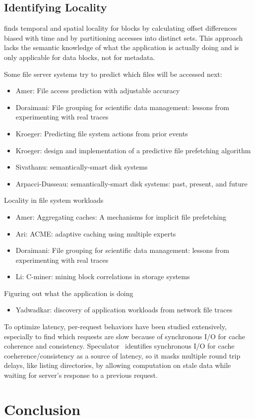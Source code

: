 \documentclass[conference]{acm_proc_article-sp} \usepackage[english]{babel}
\begin{document}
\subsection{Identifying Locality} \cite{wildani:systor2011-block-locality}
finds temporal and spatial locality for blocks by calculating offset
differences biased with time and by partitioning accesses into distinct sets.
This approach lacks the semantic knowledge of what the application is actually
doing and is only applicable for data blocks, not for metadata.

Some file server systems try to predict which files will be accessed next:

\begin{itemize} \item Amer: File access prediction with adjustable accuracy
\item Doraimani: File grouping for scientific data management: lessons from
experimenting with real traces \item Kroeger: Predicting file system actions
from prior events \item Kroeger: design and implementation of a predictive file
prefetching algorithm \item Sivathanu: semantically-smart disk systems \item
Arpacci-Dusseau: semantically-smart disk systems: past, present, and future
\end{itemize}

Locality in file system workloads \begin{itemize} \item Amer: Aggregating
caches: A mechanisms for implicit file prefetching \item Ari: ACME: adaptive
caching using multiple experts \item Doraimani: File grouping for scientific
data management: lessons from experimenting with real traces \item Li: C-miner:
mining block correlations in storage systems \end{itemize}

Figuring out what the application is doing \begin{itemize} \item Yadwadkar:
discovery of application workloads from network file traces \end{itemize}

To optimize latency, per-request behaviors have been studied extensively,
especially to find which requests are slow because of synchronous I/O for cache
coherence and consistency. Speculator~\cite{nightingale:sosp2005-speculator}
identifies synchronous I/O for cache coeherence/consistency as a source of
latency, so it masks multiple round trip delays, like listing directories, by
allowing computation on stale data while waiting for server's response to a
previous request. 

\section{Conclusion}


   
\end{document}
